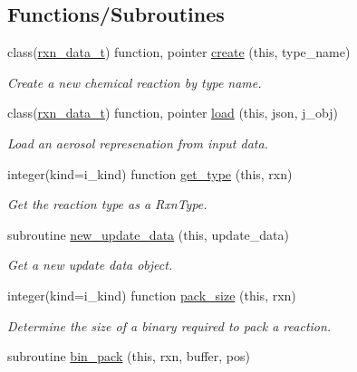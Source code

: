 \subsection*{Functions/\+Subroutines}
\begin{DoxyCompactItemize}
\item 
class(\mbox{\hyperlink{structpmc__rxn__data_1_1rxn__data__t}{rxn\+\_\+data\+\_\+t}}) function, pointer \mbox{\hyperlink{namespacepmc__rxn__factory_ad742376c2dae968c0aec048674112073}{create}} (this, type\+\_\+name)
\begin{DoxyCompactList}\small\item\em Create a new chemical reaction by type name. \end{DoxyCompactList}\item 
class(\mbox{\hyperlink{structpmc__rxn__data_1_1rxn__data__t}{rxn\+\_\+data\+\_\+t}}) function, pointer \mbox{\hyperlink{namespacepmc__rxn__factory_a57a62f05f6c35bc0fe5136416bd6de88}{load}} (this, json, j\+\_\+obj)
\begin{DoxyCompactList}\small\item\em Load an aerosol represenation from input data. \end{DoxyCompactList}\item 
integer(kind=i\+\_\+kind) function \mbox{\hyperlink{namespacepmc__rxn__factory_a1cad0d2e8d6f63fa8c0372b2b564535b}{get\+\_\+type}} (this, rxn)
\begin{DoxyCompactList}\small\item\em Get the reaction type as a Rxn\+Type. \end{DoxyCompactList}\item 
subroutine \mbox{\hyperlink{namespacepmc__rxn__factory_a212a3d8e44d9a4a79f9969ba0af02133}{new\+\_\+update\+\_\+data}} (this, update\+\_\+data)
\begin{DoxyCompactList}\small\item\em Get a new update data object. \end{DoxyCompactList}\item 
integer(kind=i\+\_\+kind) function \mbox{\hyperlink{namespacepmc__rxn__factory_a7e211932d81d6b402bffe60e03d72b72}{pack\+\_\+size}} (this, rxn)
\begin{DoxyCompactList}\small\item\em Determine the size of a binary required to pack a reaction. \end{DoxyCompactList}\item 
subroutine \mbox{\hyperlink{namespacepmc__rxn__factory_a5d87b219d8a0537b7b37d08d4e2e72e0}{bin\+\_\+pack}} (this, rxn, buffer, pos)

\end{DoxyCompactItemize}

